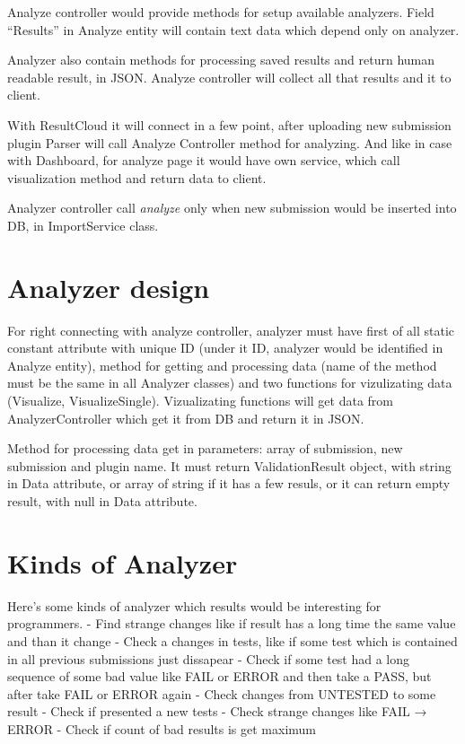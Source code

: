 \documentclass[a4paper,11pt]{article}
\begin{document}
Analyze controller would provide methods for setup available analyzers. Field “Results” in Analyze entity will contain text data which depend only on analyzer. 

Analyzer also contain methods for processing saved results and return human readable result, in JSON. Analyze controller will collect all that results and it to client. 

With ResultCloud it will connect in a few point, after uploading new submission plugin Parser will call Analyze Controller method for analyzing. And like in case with Dashboard, for analyze page it would have own service, which call visualization method and return data to client.

Analyzer controller call \emph{analyze} only when new submission would be inserted into DB, in ImportService class.
\section{Analyzer design}

For right connecting with analyze controller, analyzer must have first of all static constant attribute with unique ID (under it ID, analyzer would be identified in Analyze entity), method for getting and processing data (name of the method must be the same in all Analyzer classes) and two functions for vizulizating data (Visualize, VisualizeSingle). Vizualizating functions will get data from AnalyzerController which get it from DB and return it in JSON.

Method for processing data get in parameters: array of submission, new submission and plugin name. It must return ValidationResult object, with string in Data attribute, or array of string if it has a few resuls, or it can return empty result, with null in Data attribute.

\section{Kinds of Analyzer}

Here's some kinds of analyzer which results would be interesting for programmers.
- Find strange changes like if result has a long time the same value and than it change
- Check a changes in tests, like if some test which is contained in all previous submissions just dissapear
- Check if some test had a long sequence of some bad value like FAIL or ERROR and then take a PASS, but after take FAIL or ERROR again
- Check changes from UNTESTED to some result
- Check if presented a new tests
- Check strange changes like FAIL → ERROR
- Check if count of bad results is get maximum
\end{document}
